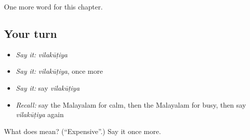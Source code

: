 \begin{grammarlens}[title={What you've built}]
One more word for this chapter.
\end{grammarlens}

\subsection*{Your turn}
\begin{itemize}
\raggedright
  \item \emph{Say it:} \emph{vilakūṭiya}
  \item \emph{Say it:} \emph{vilakūṭiya}, once more
  \item \emph{Say it:} say \emph{vilakūṭiya}
  \item \emph{Recall:} say the Malayalam for calm, then the Malayalam for busy, then say \emph{vilakūṭiya} again
\end{itemize}

\begin{tcolorbox}[breakable,colback=teal!4,colframe=teal!35!black,title={Before you move on}]
What does  mean? (\textquotedblleft{}Expensive\textquotedblright{}.) Say it once more.
\end{tcolorbox}
